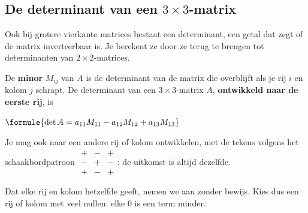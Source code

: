 \begin{oefeningen}
\end{oefeningen}

\subsection{De determinant van een \texorpdfstring{$3 \times 3$}{3x3}-matrix}

Ook bij grotere vierkante matrices bestaat een determinant, een getal dat zegt of de matrix inverteerbaar is. Je berekent ze door ze terug te brengen tot determinanten van $2 \times 2$-matrices.

\begin{theorie}
De \textbf{\textcolor{accent}{minor}} $M_{ij}$ van $A$ is de determinant van de matrix die overblijft als je rij $i$ en kolom $j$ schrapt. De determinant van een $3 \times 3$-matrix $A$, \textbf{\textcolor{accent}{ontwikkeld naar de eerste rij}}, is

\vspace{1mm}
\qquad $\formule{\det A = a_{11}M_{11} - a_{12}M_{12} + a_{13}M_{13}}$

\vspace{1mm}
Je mag ook naar een andere rij of kolom ontwikkelen, met de tekens volgens het schaakbordpatroon $\begin{smallmatrix} + & - & + \\ - & + & - \\ + & - & + \end{smallmatrix}$: de uitkomst is altijd dezelfde.
\end{theorie}

Dat elke rij en kolom hetzelfde geeft, nemen we aan zonder bewijs. Kies dus een rij of kolom met veel nullen: elke 0 is een term minder.


